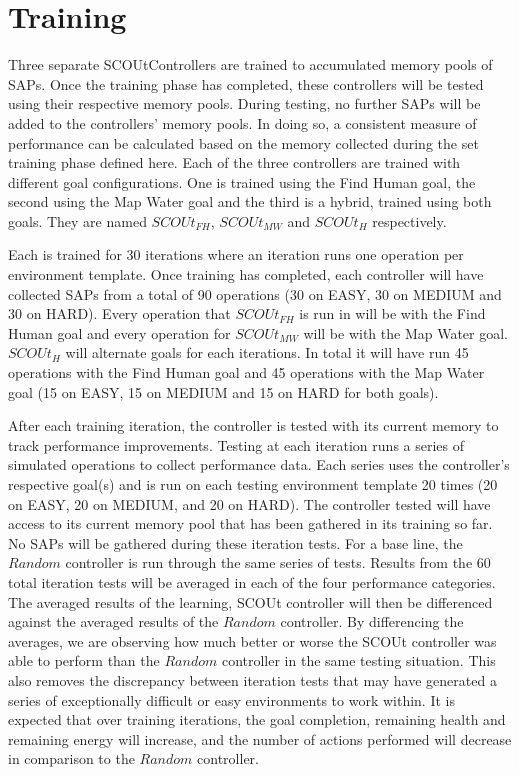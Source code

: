 \section{Training}
Three separate SCOUtControllers are trained to accumulated memory pools of SAPs.
Once the training phase has completed, these controllers will be tested using their respective memory pools.
During testing, no further SAPs will be added to the controllers' memory pools.
In doing so, a consistent measure of performance can be calculated based on the memory collected during the set training phase defined here.
Each of the three controllers are trained with different goal configurations.
One is trained using the Find Human goal, the second using the Map Water goal and the third is a hybrid, trained using both goals.
They are named $SCOUt_{FH}$, $SCOUt_{MW}$ and $SCOUt_{H}$ respectively.

Each is trained for 30 iterations where an iteration runs one operation per environment template.
Once training has completed, each controller will have collected SAPs from a total of 90 operations (30 on EASY, 30 on MEDIUM and 30 on HARD).
Every operation that $SCOUt_{FH}$ is run in will be with the Find Human goal and every operation for $SCOUt_{MW}$ will be with the Map Water goal.
$SCOUt_{H}$ will alternate goals for each iterations.
In total it will have run 45 operations with the Find Human goal and 45 operations with the Map Water goal (15 on EASY, 15 on MEDIUM and 15 on HARD for both goals).

After each training iteration, the controller is tested with its current memory to track performance improvements.
Testing at each iteration runs a series of simulated operations to collect performance data.
Each series uses the controller's respective goal(s) and is run on each testing environment template 20 times (20 on EASY, 20 on MEDIUM, and 20 on HARD).
The controller tested will have access to its current memory pool that has been gathered in its training so far.
No SAPs will be gathered during these iteration tests.
For a base line, the $Random$ controller is run through the same series of tests.
Results from the 60 total iteration tests will be averaged in each of the four performance categories.
The averaged results of the learning, SCOUt controller will then be differenced against the averaged results of the $Random$ controller.
By differencing the averages, we are observing how much better or worse the SCOUt controller was able to perform than the $Random$ controller in the same testing situation.
This also removes the discrepancy between iteration tests that may have generated a series of exceptionally difficult or easy environments to work within.
It is expected that over training iterations, the goal completion, remaining health and remaining energy will increase, and the number of actions performed will decrease  in comparison to the $Random$ controller.

